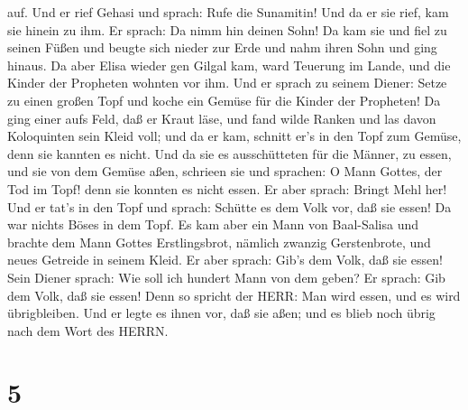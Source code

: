 auf.  Und er rief Gehasi und sprach: Rufe die Sunamitin!
Und da er sie rief, kam sie hinein zu ihm. Er sprach: Da nimm hin deinen
Sohn!  Da kam sie und fiel zu seinen Füßen und beugte sich
nieder zur Erde und nahm ihren Sohn und ging hinaus.  Da
aber Elisa wieder gen Gilgal kam, ward Teuerung im Lande, und die Kinder
der Propheten wohnten vor ihm. Und er sprach zu seinem Diener: Setze zu
einen großen Topf und koche ein Gemüse für die Kinder der Propheten!
 Da ging einer aufs Feld, daß er Kraut läse, und fand wilde
Ranken und las davon Koloquinten sein Kleid voll; und da er kam, schnitt
er's in den Topf zum Gemüse, denn sie kannten es nicht. 
Und da sie es ausschütteten für die Männer, zu essen, und sie von dem
Gemüse aßen, schrieen sie und sprachen: O Mann Gottes, der Tod im Topf!
denn sie konnten es nicht essen.  Er aber sprach: Bringt
Mehl her! Und er tat's in den Topf und sprach: Schütte es dem Volk vor,
daß sie essen! Da war nichts Böses in dem Topf.  Es kam
aber ein Mann von Baal-Salisa und brachte dem Mann Gottes Erstlingsbrot,
nämlich zwanzig Gerstenbrote, und neues Getreide in seinem Kleid. Er
aber sprach: Gib's dem Volk, daß sie essen!  Sein Diener
sprach: Wie soll ich hundert Mann von dem geben? Er sprach: Gib dem
Volk, daß sie essen! Denn so spricht der HERR: Man wird essen, und es
wird übrigbleiben.  Und er legte es ihnen vor, daß sie
aßen; und es blieb noch übrig nach dem Wort des HERRN.

\hypertarget{section-4}{%
\section{5}\label{section-4}}


